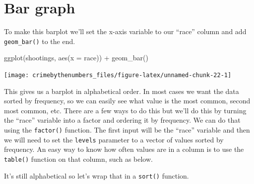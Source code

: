 \documentclass[
  12pt,
  openany]{book}
\newenvironment{Shaded}{\begin{snugshade}}{\end{snugshade}}
\newcommand{\AttributeTok}[1]{\textcolor[rgb]{0.61,0.61,0.61}{#1}}
\newcommand{\CommentTok}[1]{\textcolor[rgb]{0.37,0.37,0.37}{\textit{#1}}}
\newcommand{\FunctionTok}[1]{\textcolor[rgb]{0,0,0}{#1}}
\newcommand{\NormalTok}[1]{#1}
\newcommand{\SpecialCharTok}[1]{\textcolor[rgb]{0,0,0}{#1}}
\begin{document}
\hypertarget{bar-graph}{%
\section{Bar graph}\label{bar-graph}}

To make this barplot we'll set the x-axis variable to our ``race'' column and add \texttt{geom\_bar()} to the end.

\begin{Shaded}
\begin{Highlighting}[]
\FunctionTok{ggplot}\NormalTok{(shootings, }\FunctionTok{aes}\NormalTok{(}\AttributeTok{x =}\NormalTok{ race)) }\SpecialCharTok{+} 
  \FunctionTok{geom\_bar}\NormalTok{()}
\end{Highlighting}
\end{Shaded}

\begin{center}\texttt{[image: crimebythenumbers\_files/figure-latex/unnamed-chunk-22-1]} \end{center}

This gives us a barplot in alphabetical order. In most cases we want the data sorted by frequency, so we can easily see what value is the most common, second most common, etc. There are a few ways to do this but we'll do this by turning the ``race'' variable into a factor and ordering it by frequency. We can do that using the \texttt{factor()} function. The first input will be the ``race'' variable and then we will need to set the \texttt{levels} parameter to a vector of values sorted by frequency. An easy way to know how often values are in a column is to use the \texttt{table()} function on that column, such as below.

\begin{Shaded}
\end{Shaded}

It's still alphabetical so let's wrap that in a \texttt{sort()} function.

\begin{Shaded}
\end{Shaded}
\end{document}
